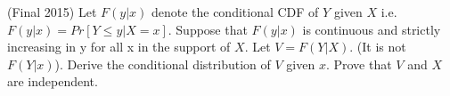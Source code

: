 \documentclass[answers]{exam}
\begin{document}
\begin{questions}
\question (Final 2015) Let $F(y|x)$ denote the conditional CDF of $Y$ given $X$ i.e. $F(y|x) = Pr[Y \leq y|X=x]$. Suppose that $F(y|x)$ is continuous and strictly increasing in y for all x in the support of $X$. Let $V = F(Y|X)$. (It is not $F(Y|x)$). Derive the conditional distribution of $V$ given $x$. Prove that $V$ and $X$ are independent.
\begin{solution} 
\end{solution}


\end{questions}
\end{document}
